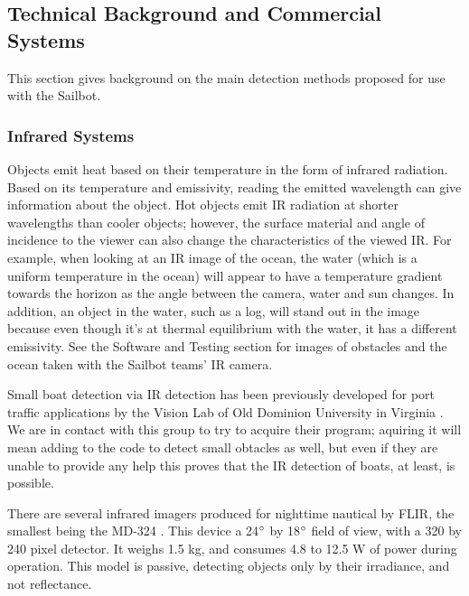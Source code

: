 \subsection{\label{sec:intro:technical-background}Technical Background and Commercial Systems}
This section gives background on the main detection methods proposed for use with the Sailbot.


\subsubsection{\label{sec:intro:technical-background:ir}Infrared Systems}
Objects emit heat based on their temperature in the form of infrared radiation. Based on its temperature and emissivity, reading the emitted wavelength can give information about the object. Hot objects emit IR radiation at shorter wavelengths than cooler objects; however, the surface material and angle of incidence to the viewer can also change the characteristics of the viewed IR. For example, when looking at an IR image of the ocean, the water (which is a uniform temperature in the ocean) will appear to have a temperature gradient towards the horizon as the angle between the camera, water and sun changes. In addition, an object in the water, such as a log, will stand out in the image because even though it's at thermal equilibrium with the water, it has a different emissivity. See the Software and Testing section for images of obstacles and the ocean taken with the Sailbot teams' IR camera.

Small boat detection via IR detection has been previously developed for port traffic applications by the Vision Lab of Old Dominion University in Virginia \cite{ODU-boat-IR-detection}. We are in contact with this group to try to acquire their program; aquiring it will mean adding to the code to detect small obtacles as well, but even if they are unable to provide any help this proves that the IR detection of boats, at least, is possible.

There are several infrared imagers produced for nighttime nautical by FLIR, the smallest being the MD-324 \cite{flir-md324}. This device a 24$\degree$ by 18$\degree$ field of view, with a 320 by 240 pixel detector. It weighs 1.5 kg, and consumes 4.8 to 12.5 W of power during operation. This model is passive, detecting objects only by their irradiance, and not reflectance.


